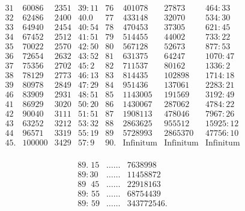 \documentclass[11pt,a4paper]{article}
\begin{document}
\[
\begin{array}{r|r|r|r||r|r|r|r}
31 & 60086 & 2351 & 39{:}11 & 76 & 401078 & 27873 & 464{:}33 \\
32 & 62486 & 2400 & 40.0 & 77 & 433148 & 32070 & 534{:}30 \\
33 & 64940 & 2454 & 40{:}54 & 78 & 470453 & 37305 & 621{:}45 \\
34 & 67452 & 2512 & 41{:}51 & 79 & 514455 & 44002 & 733{:}22 \\
35 & 70022 & 2570 & 42{:}50 & 80 & 567128 & 52673 & 877{:}53 \\
\hline
36 & 72654 & 2632 & 43{:}52 & 81 & 631375 & 64247 & 1070{:}47 \\
37 & 75356 & 2702 & 45{:}2 & 82 & 711537 & 80162 & 1336{:}2 \\
38 & 78129 & 2773 & 46{:}13 & 83 & 814435 & 102898 & 1714{:}18 \\
39 & 80978 & 2849 & 47{:}29 & 84 & 951436 & 137061 & 2283{:}21 \\
46 & 83909 & 2931 & 48{:}51 & 85 & 1143005 & 191569 & 3192{:}49 \\
\hline
41 & 86929 & 3020 & 50{:}20 & 86 & 1430067 & 287062 & 4784{:}22 \\
42 & 90040 & 3111 & 51{:}51 & 87 & 1908113 & 478046 & 7967{:}26 \\
43 & 63252 & 3212 & 53{:}32 & 88 & 2863625 & 955512 & 15925{:}12 \\
44 & 96571 & 3319 & 55{:}19 & 89 & 5728993 & 2865370 & 47756{:}10 \\
45. & 100000 & 3429 & 57{:}9 & 90. & \text{Infinitum} & \text{Infinitum} & \text{Infinitum} \\
\end{array}
\]


\[
\begin{array}{lcl}
89.\;15 & \ldots\ldots & 7638998 \\
89{:}30 & \ldots\ldots & 11458872 \\
89\;\;45 & \ldots\ldots & 22918163 \\
89{:}\,55 & \ldots\ldots & 68754439 \\
89{:}\,59 & \ldots\ldots & 343772546.
\end{array}
\]
\end{document}

